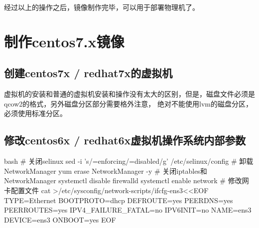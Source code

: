 经过以上的操作之后，镜像制作完毕，可以用于部署物理机了。

\section{制作centos7.x镜像}
\subsection{创建centos7x / redhat7x的虚拟机}
虚拟机的安装和普通的虚拟机安装和操作没有太大的区别，但是，磁盘文件必须是qcow2的格式，另外磁盘分区部分需要格外注意，
{\color{red}绝对不能使用lvm的磁盘分区，必须使用标准分区。}

\subsection{修改centos6x / redhat6x虚拟机操作系统内部参数}
\begin{code-block}{bash}
# 关闭selinux
sed -i 's/=enforcing/=disabled/g' /etc/selinux/config
# 卸载NetworkManager
yum erase NetworkManager -y
# 关闭iptables和NetworkManager
systemctl disable firewalld
systemctl enable network
# 修改网卡配置文件
cat >/etc/sysconfig/network-scripts/ifcfg-ens3<<EOF
TYPE=Ethernet
BOOTPROTO=dhcp
DEFROUTE=yes
PEERDNS=yes
PEERROUTES=yes
IPV4_FAILURE_FATAL=no
IPV6INIT=no
NAME=ens3
DEVICE=ens3
ONBOOT=yes
EOF
\end{code-block}

